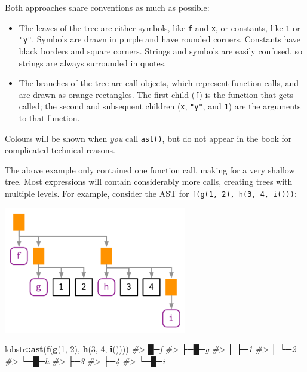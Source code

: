 \documentclass[]{book}
\newenvironment{Shaded}{\begin{snugshade}}{\end{snugshade}}
\newcommand{\CommentTok}[1]{\textcolor[rgb]{0.37,0.37,0.37}{\textit{#1}}}
\newcommand{\DecValTok}[1]{\textcolor[rgb]{0.06,0.06,0.06}{#1}}
\newcommand{\KeywordTok}[1]{\textcolor[rgb]{0.27,0.27,0.27}{\textbf{#1}}}
\newcommand{\NormalTok}[1]{#1}
\newcommand{\OperatorTok}[1]{\textcolor[rgb]{0.43,0.43,0.43}{\textbf{#1}}}
\begin{document}
Both approaches share conventions as much as possible:

\begin{itemize}
\item
  The leaves of the tree are either symbols, like \texttt{f} and \texttt{x}, or constants,
  like \texttt{1} or \texttt{"y"}. Symbols are drawn in purple and have rounded corners.
  Constants have black borders and square corners. Strings and symbols are
  easily confused, so strings are always surrounded in quotes.
\item
  The branches of the tree are call objects, which represent function calls,
  and are drawn as orange rectangles. The first child (\texttt{f}) is the function
  that gets called; the second and subsequent children (\texttt{x}, \texttt{"y"}, and \texttt{1})
  are the arguments to that function.
\end{itemize}

Colours will be shown when \emph{you} call \texttt{ast()}, but do not appear in the book for complicated technical reasons.

The above example only contained one function call, making for a very shallow tree. Most expressions will contain considerably more calls, creating trees with multiple levels. For example, consider the AST for \texttt{f(g(1,\ 2),\ h(3,\ 4,\ i()))}:

\begin{center}\includegraphics[width=3.15in]{diagrams/expressions/complicated} \end{center}

\begin{Shaded}
\begin{Highlighting}[]
\NormalTok{lobstr}\OperatorTok{::}\KeywordTok{ast}\NormalTok{(}\KeywordTok{f}\NormalTok{(}\KeywordTok{g}\NormalTok{(}\DecValTok{1}\NormalTok{, }\DecValTok{2}\NormalTok{), }\KeywordTok{h}\NormalTok{(}\DecValTok{3}\NormalTok{, }\DecValTok{4}\NormalTok{, }\KeywordTok{i}\NormalTok{())))}
\CommentTok{#> █─f }
\CommentTok{#> ├─█─g }
\CommentTok{#> │ ├─1 }
\CommentTok{#> │ └─2 }
\CommentTok{#> └─█─h }
\CommentTok{#>   ├─3 }
\CommentTok{#>   ├─4 }
\CommentTok{#>   └─█─i}
\end{Highlighting}
\end{Shaded}
\end{document}
